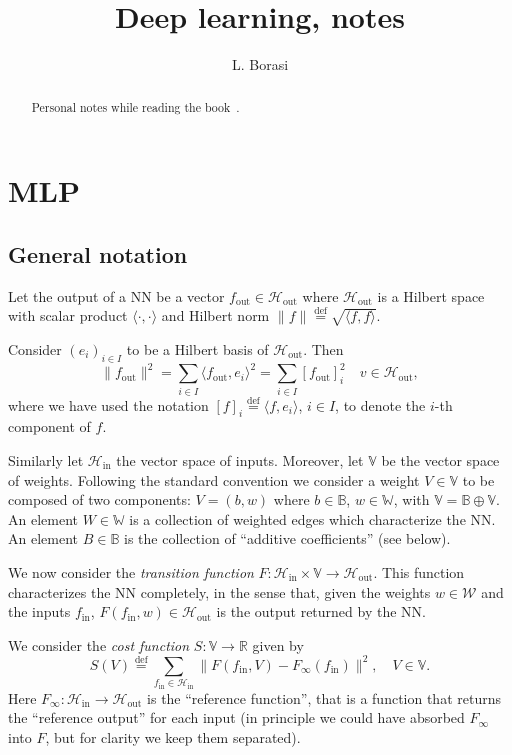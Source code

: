\documentclass[10pt, a4paper]{article}
\title{Deep learning, notes}
\author{L. Borasi}
\theoremstyle{plain}
\theoremstyle{definition}
\theoremstyle{definition}
\theoremstyle{definition}
\theoremstyle{definition}
\theoremstyle{definition}
\theoremstyle{definition}
\theoremstyle{definition}
\theoremstyle{remark}
\theoremstyle{remark}
\theoremstyle{rudin-style-generic}
\theoremstyle{rudin-style-generic*}
\theoremstyle{rudin-style-theorem}
\newcommand{\deq}{\stackrel{\mathrm{def}}{=}}
\newcommand{\RR}{\mathbb R}
\begin{document}
\maketitle
\begin{abstract}
	Personal notes while reading the book~\cite{goodfellowDeepLearning2016}.
\end{abstract}
\tableofcontents


\section{MLP}
\subsection{General notation}\label{sec:general-notation}
Let the output of a NN be a vector $f_{\text{out}}\in \mathcal H_{\text{out}}$ 
where $\mathcal H_{\text{out}}$ is a Hilbert space with scalar product $\langle\cdot,\cdot\rangle$
and Hilbert norm $\|f\|\deq \sqrt{\langle f,f\rangle}$.
 
Consider $(e_i)_{i\in I}$ to be a Hilbert basis of $\mathcal H_{\text{out}}$.
Then
\begin{equation*}
	\| f_{\text{out}} \|^2 = \sum_{i\in I} \langle f_{\text{out}}, e_i \rangle^2 = \sum_{i\in I}  [f_{\text{out}}]_i^2 
	\quad v\in\mathcal H_{\text{out}}
	,
\end{equation*}
where we have used the notation $[f]_i \deq \langle f, e_i\rangle$, $i\in I$, to denote the $i$-th component of $f$.

Similarly let $\mathcal H_{\text{in}}$ the vector space of inputs.
Moreover, let $\mathbb V$ be the vector space of weights.
Following the standard convention we consider a weight $V\in\mathbb V$ to be composed of two components:
$V = (b,w)$ where $b\in \mathbb B$, $w\in\mathbb W$, with $\mathbb V=\mathbb B\oplus\mathbb V$.
An element $W\in\mathbb W$ is a collection of weighted edges which characterize the NN.
An element $B\in\mathbb B$ is the collection of ``additive coefficients'' (see below).

We now consider the \textit{transition function}  $F:\mathcal H_{\text{in}} \times \mathbb V \rightarrow \mathcal H_{\text{out}}$.
This function characterizes the NN completely, in the sense that, given the weights $w\in\mathcal W$ and the inputs $f_{\text{in}}$,
$F(f_{\text{in}}, w)\in\mathcal H_{\text{out}}$ is the output returned by the NN.

We consider the \textit{cost function} $S:\mathbb V\rightarrow \RR$ given by
\begin{equation*}
	S(V) \deq \sum_{f_{\text{in}}\in\mathcal H_{\text{in}}} \| F(f_{\text{in}}, V) - F_\infty(f_{\text{in}}) \|^2,
	\quad V\in\mathbb V
	.
\end{equation*}
Here $F_\infty:\mathcal H_{\text{in}}\rightarrow\mathcal H_{\text{out}}$ is the ``reference function'',
that is a function that returns the ``reference output'' for each input (in principle we could have absorbed $F_\infty$ into $F$,
but for clarity we keep them separated).
\end{document}
